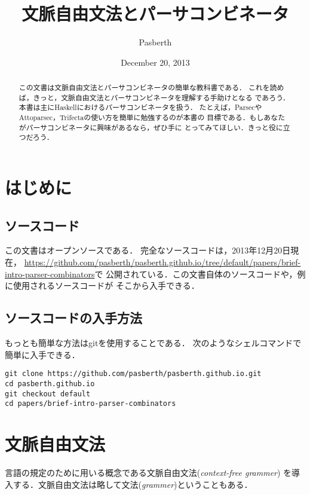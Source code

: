 \documentclass{jarticle}
\title{文脈自由文法とパーサコンビネータ}
\author{Pasberth}
\date{December 20, 2013}
\begin{document}
\maketitle

\begin{abstract}
この文書は文脈自由文法とパーサコンビネータの簡単な教科書である．
これを読めば，きっと，文脈自由文法とパーサコンビネータを理解する手助けとなる
であろう．本書は主にHaskellにおけるパーサコンビネータを扱う．
たとえば，ParsecやAttoparsec，Trifectaの使い方を簡単に勉強するのが本書の
目標である．もしあなたがパーサコンビネータに興味があるなら，ぜひ手に
とってみてほしい．きっと役に立つだろう．
\end{abstract}

\tableofcontents

\section{はじめに}

\subsection{ソースコード}

この文書はオープンソースである．
完全なソースコードは，2013年12月20日現在，
\url{https://github.com/pasberth/pasberth.github.io/tree/default/papers/brief-intro-parser-combinators}で
公開されている．この文書自体のソースコードや，例に使用されるソースコードが
そこから入手できる．

\subsection{ソースコードの入手方法}

もっとも簡単な方法はgitを使用することである．
次のようなシェルコマンドで簡単に入手できる．


\lstset{basicstyle=\ttfamily,}
\begin{lstlisting}
git clone https://github.com/pasberth/pasberth.github.io.git
cd pasberth.github.io
git checkout default
cd papers/brief-intro-parser-combinators
\end{lstlisting}

\section{文脈自由文法}

言語の規定のために用いる概念である文脈自由文法({\it context-free grammer})
を導入する．文脈自由文法は略して文法({\it grammer})ということもある．
\end{document}
